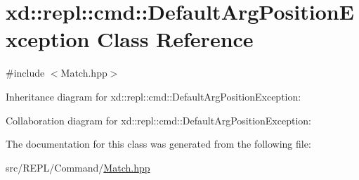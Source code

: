 \hypertarget{classxd_1_1repl_1_1cmd_1_1_default_arg_position_exception}{}\section{xd\+:\+:repl\+:\+:cmd\+:\+:Default\+Arg\+Position\+Exception Class Reference}
\label{classxd_1_1repl_1_1cmd_1_1_default_arg_position_exception}


{\ttfamily \#include $<$Match.\+hpp$>$}



Inheritance diagram for xd\+:\+:repl\+:\+:cmd\+:\+:Default\+Arg\+Position\+Exception\+:


Collaboration diagram for xd\+:\+:repl\+:\+:cmd\+:\+:Default\+Arg\+Position\+Exception\+:


The documentation for this class was generated from the following file\+:\begin{DoxyCompactItemize}
\item 
src/\+R\+E\+P\+L/\+Command/\mbox{\hyperlink{_command_2_match_8hpp}{Match.\+hpp}}\end{DoxyCompactItemize}
